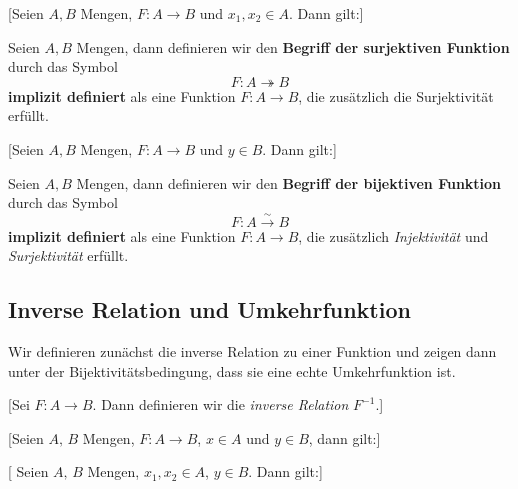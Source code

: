\documentclass[main.tex]{subfiles}
\begin{document}
%
[Seien \(A,B\) Mengen, \(F\colon A\to B\) und \(x_1,x_2\in A\). Dann gilt:]


\begin{definition}
Seien \(A,B\) Mengen, dann definieren wir den \textbf{Begriff der surjektiven Funktion}
durch das Symbol
\[
F\colon A\twoheadrightarrow B
\]
\textbf{implizit definiert} als eine Funktion \(F\colon A\to B\), die zusätzlich die Surjektivität erfüllt.
\end{definition}

%
[Seien \(A,B\) Mengen, \(F\colon A\to B\) und \(y\in B\). Dann gilt:]


\begin{definition}
Seien \(A,B\) Mengen, dann definieren wir den \textbf{Begriff der bijektiven Funktion}
durch das Symbol
\[
F\colon A \xrightarrow{\sim} B
\]
\textbf{implizit definiert} als eine Funktion \(F\colon A\to B\), die zusätzlich
\emph{Injektivität} und \emph{Surjektivität} erfüllt.
\end{definition}

\subsection{Inverse Relation und Umkehrfunktion}

Wir definieren zunächst die inverse Relation zu einer Funktion und zeigen dann unter der Bijektivitätsbedingung, dass sie eine echte Umkehrfunktion ist.

[Sei \(F \colon A \to B\). Dann definieren wir die \emph{inverse Relation} \(F^{-1}\).]

[Seien \(A,\,B\) Mengen, \(F \colon A \to B\), \(x\in A\) und \(y\in B\), dann gilt:]
\begin{tabproofsplit}
\proofpart{\(\vdash\)}
\closeproofpart
\end{tabproofsplit}

[
Seien \(A,\,B\) Mengen, \(x_1,x_2\in A\), \(y\in B\). Dann gilt:]
\begin{tabproof}
\end{tabproof}
\end{document}
